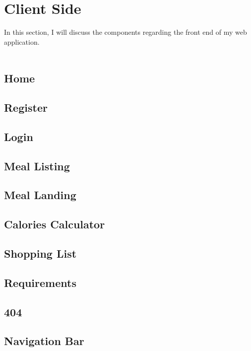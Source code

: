 \section{Client Side}

In this section, I will discuss the components regarding the front end of my web application.\\ \\

\subsection{Home}

\subsection{Register}

\subsection{Login}

\subsection{Meal Listing}

\subsection{Meal Landing}

\subsection{Calories Calculator}

\subsection{Shopping List}

\subsection{Requirements}

\subsection{404}

\subsection{Navigation Bar}

